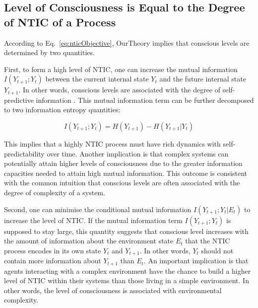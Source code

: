 \documentclass[utf8]{article}
\begin{document}
		
	    \subsection{Level of Consciousness is Equal to the Degree of NTIC of a Process}\label{sec:cl}
            According to Eq.~\ref{eq:nticObjective}, \ac{OurTheory} implies that conscious levels are determined by two quantities. 
            
            First, to form a high level of NTIC, one can increase the mutual information $I(Y_{t+1};Y_{t})$ between the current internal state $Y_t$ and the future internal state $Y_{t+1}$. In other words, conscious levels are associated with the degree of self-predictive information \citep{bialek2001predictability}. This mutual information term can be further decomposed to two information entropy quantities: 
            
            \begin{equation}
            \label{eq:SelfEntropy}
            I(Y_{t+1};Y_{t}) = H(Y_{t+1}) - H(Y_{t+1}|Y_t)
            \end{equation}
            
            This implies that a highly NTIC process must have rich dynamics with self-predictability over time. Another implication is that complex systems can potentially attain higher levels of consciousness due to the greater information capacities needed to attain high mutual information. This outcome is consistent with the common intuition that conscious levels are often associated with the degree of complexity of a system.
    
    	    Second, one can minimise the conditional mutual information $I(Y_{t+1};Y_{t}|E_{t})$ to increase the level of NTIC. If the mutual information term $I(Y_{t+1};Y_t)$ is supposed to stay large, this quantity suggests that conscious level increases with the amount of information about the environment state $E_t$ that the NTIC process encodes in its own state $Y_t$ and $Y_{t+1}$. In other words, $Y_t$ should not contain more information about $Y_{t+1}$ than $E_t$. An important implication is that agents interacting with a complex environment have the chance to build a higher level of NTIC within their systems than those living in a simple environment. In other words, the level of consciousness is associated with environmental complexity. 
    	   
\end{document}

